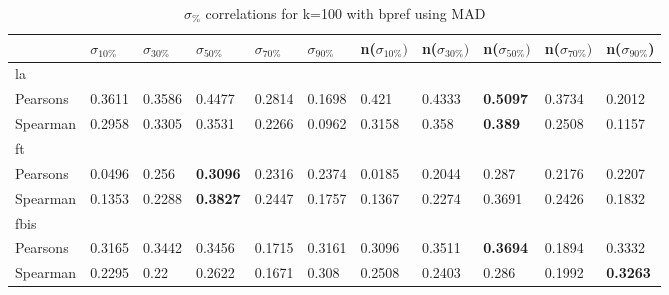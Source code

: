 \documentclass{sig-alternate}
\begin{document}
\begin{table}[h!]
\centering
\begin{tabular}{|l||l|l|l|l|l||l|l|l|l|l|}
\hline
& $\sigma_{10\%}$ & $\sigma_{30\%}$ & $\sigma_{50\%}$ & $\sigma_{70\%}$ & $\sigma_{90\%}$ & n($\sigma_{10\%})$ & n($\sigma_{30\%})$ & n($\sigma_{50\%})$ & n($\sigma_{70\%})$ & n($\sigma_{90\%}$) \\ \hline
\hline la &  &  &  &  &  &  &  &  &  &  \\ \hline
Pearsons & 0.3611 & 0.3586 & 0.4477 & 0.2814 & 0.1698 & 0.421 & 0.4333 & \textbf{0.5097} & 0.3734 & 0.2012 \\ \hline
Spearman & 0.2958 & 0.3305 & 0.3531 & 0.2266 & 0.0962 & 0.3158 & 0.358 & \textbf{0.389} & 0.2508 & 0.1157 \\ \hline
\hline ft &  &  &  &  &  &  &  &  &  &  \\ \hline
Pearsons & 0.0496 & 0.256 & \textbf{0.3096} & 0.2316 & 0.2374 & 0.0185 & 0.2044 & 0.287 & 0.2176 & 0.2207 \\ \hline
Spearman & 0.1353 & 0.2288 & \textbf{0.3827} & 0.2447 & 0.1757 & 0.1367 & 0.2274 & 0.3691 & 0.2426 & 0.1832 \\ \hline
\hline fbis &  &  &  &  &  &  &  &  &  &  \\ \hline
Pearsons & 0.3165 & 0.3442 & 0.3456 & 0.1715 & 0.3161 & 0.3096 & 0.3511 & \textbf{0.3694} & 0.1894 & 0.3332 \\ \hline
Spearman & 0.2295 & 0.22 & 0.2622 & 0.1671 & 0.308 & 0.2508 & 0.2403 & 0.286 & 0.1992 & \textbf{0.3263} \\ \hline
\end{tabular}
\caption{$\sigma_{\%}$ correlations for k=100 with bpref using MAD}
\end{table}
\end{document}
